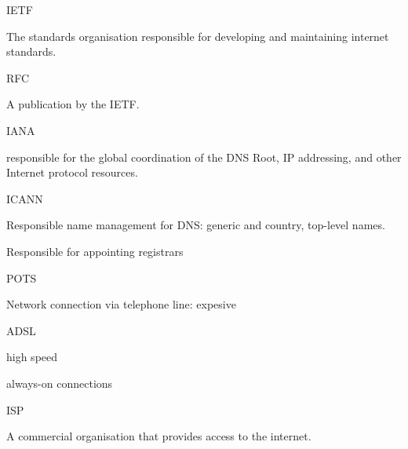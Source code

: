 \documentclass[main.tex]{subfiles}
\begin{document}
\small

\layer{}

\begin{card}{IETF}
\item The standards organisation responsible for developing and maintaining internet standards.
\end{card}

\begin{card}{RFC}
\item A publication by the IETF.
\end{card}

\begin{card}{IANA}
\item responsible for the global coordination of the DNS Root, IP addressing, and other Internet protocol resources.
\end{card}

\begin{card}{ICANN}
\item Responsible name management for DNS: generic and country, top-level names.
\item Responsible for appointing registrars
\end{card}

\begin{card}{POTS}
\item Network connection via telephone line: expesive
\end{card}

\begin{card}{ADSL}
\item high speed
\item always-on connections
\end{card}

\begin{card}{ISP}
\item A commercial organisation that provides access to the internet.
\end{card}
\end{document}
